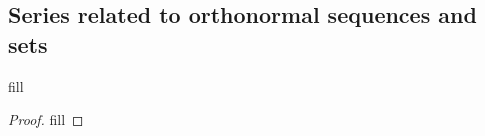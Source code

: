 \subsection{Series related to orthonormal sequences and sets}

\begin{exercise}{1}
fill
\end{exercise}
\begin{proof}
fill
\end{proof}